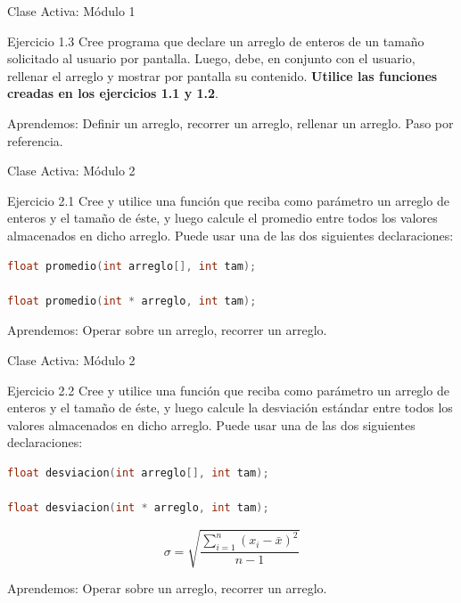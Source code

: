 \documentclass{beamer}
\begin{document}
\begin{frame}[fragile]{Clase Activa: Módulo 1}
\begin{exampleblock}{Ejercicio 1.3}
Cree programa que declare un arreglo de enteros de un tamaño solicitado al usuario por pantalla. Luego, debe, en conjunto con el usuario, rellenar el arreglo y mostrar por pantalla su contenido. \textbf{Utilice las funciones creadas en los ejercicios 1.1 y 1.2}.
\end{exampleblock}
 
{\tiny Aprendemos: Definir un arreglo, recorrer un arreglo, rellenar un arreglo. Paso por referencia.}
\end{frame}

\begin{frame}[fragile]{Clase Activa: Módulo 2}
\begin{exampleblock}{Ejercicio 2.1}
Cree y utilice una función que reciba como parámetro un arreglo de enteros y el tamaño de éste, y luego calcule el promedio entre todos los valores almacenados en dicho arreglo. Puede usar una de las dos siguientes declaraciones:
\begin{lstlisting}[language=C, basicstyle=\scriptsize]
float promedio(int arreglo[], int tam);

float promedio(int * arreglo, int tam);
\end{lstlisting}
\end{exampleblock}

{\tiny Aprendemos: Operar sobre un arreglo, recorrer un arreglo.}
\end{frame}


\begin{frame}[fragile]{Clase Activa: Módulo 2}
\begin{exampleblock}{Ejercicio 2.2}
Cree y utilice una función que reciba como parámetro un arreglo de enteros y el tamaño de éste, y luego calcule la desviación estándar entre todos los valores almacenados en dicho arreglo. Puede usar una de las dos siguientes declaraciones:
\begin{lstlisting}[language=C, basicstyle=\scriptsize]
float desviacion(int arreglo[], int tam);

float desviacion(int * arreglo, int tam);
\end{lstlisting}

$$ \sigma = \sqrt{\frac{\sum_{i=1}^{n}(x_i - \bar{x})^2}{n-1}}$$
\end{exampleblock}

{\tiny Aprendemos: Operar sobre un arreglo, recorrer un arreglo.}
\end{frame}
\end{document}
